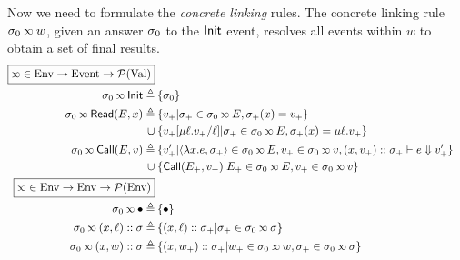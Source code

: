 Now we need to formulate the \emph{concrete linking} rules.
The concrete linking rule $\ctx_0\semlink w$, given an answer $\sigma_0$ to the $\textsf{Init}$ event, resolves all events within $w$ to obtain a set of final results.
\begin{align*}
  \fbox{$\semlink\in\Ctx\rightarrow\Event\rightarrow\pset(\Value)$}                                                                                                                           \\
  \ctx_0\semlink\InitE\triangleq                         & \: \{\ctx_0\}                                                                                                                      \\
  \ctx_0\semlink\ReadE(\event,x)\triangleq               & \: \{v_+|\ctx_+\in\ctx_0\semlink\event,\ctx_+(x)=v_+\}                                                                             \\
  \cup                                                   & \: \{v_+[\mu\ell.v_+/\ell]|\ctx_+\in\ctx_0\semlink E,\ctx_+(x)=\mu\ell.v_+\}                                                       \\
  \ctx_0\semlink\CallE(\event,v)\triangleq               & \: \{v_+'|\langle\lambda x.e,\ctx_+\rangle\in\ctx_0\semlink E, v_+\in\ctx_0\semlink v, (x,v_+)\cons\ctx_+\vdash e\Downarrow v_+'\} \\
  \cup                                                   & \: \{\CallE(\event_+,v_+)|\event_+\in\ctx_0\semlink E, v_+\in\ctx_0\semlink v\}                                                    \\
  \fbox{$\semlink\in\Ctx\rightarrow\Ctx\rightarrow\pset(\Ctx)$}                                                                                                                               \\
  \ctx_0\semlink\bullet\triangleq                        & \: \{\bullet\}                                                                                                                     \\
  \ctx_0\semlink(x,\ell)\cons\ctx\triangleq              & \: \{(x,\ell)\cons\ctx_+|\ctx_+\in\ctx_0\semlink\ctx\}                                                                             \\
  \ctx_0\semlink(x,w)\cons\ctx\triangleq                 & \: \{(x,w_+)\cons\ctx_+|w_+\in\ctx_0\semlink w,\ctx_+\in\ctx_0\semlink\ctx\}                                                       \\

\end{align*}
